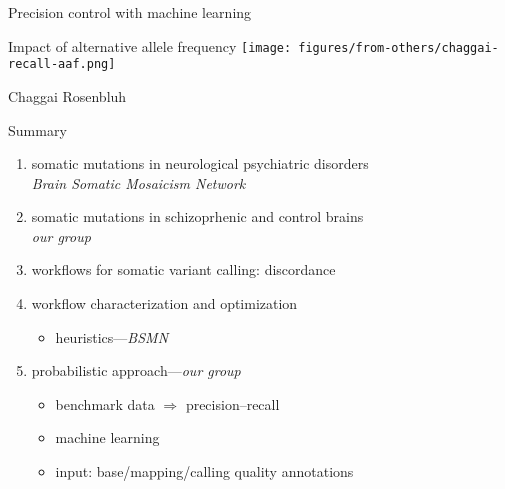 \documentclass{beamer}
\begin{document}
\begin{frame}{Precision control with machine learning}

\end{frame}

\begin{frame}{Impact of alternative allele frequency}
\texttt{[image: figures/from-others/chaggai-recall-aaf.png]}

\tiny{Chaggai Rosenbluh}
\end{frame}

\begin{frame}{Summary}
\begin{enumerate}
\item \alert{somatic mutations} in neurological psychiatric disorders\\
\emph{Brain Somatic Mosaicism Network}
\item somatic mutations in \alert{schizoprhenic} and control brains\\
\emph{our group}
\item workflows for somatic variant calling: \alert{discordance}
\item workflow characterization and \alert{optimization}
\begin{itemize}
\item heuristics---\emph{BSMN}
\end{itemize}
\item probabilistic approach---\emph{our group}
\begin{itemize}
\item benchmark data \(\Rightarrow\) precision--recall
\item \alert{machine learning}
\item input: base/mapping/calling \alert{quality annotations}
\end{itemize}
\end{enumerate}
\end{frame}
\end{document}
